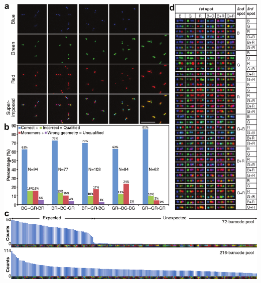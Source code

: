 \begin{FPfigure} %
\includegraphics[width=\textwidth]{figures/dna3}
\caption[Dual-labeled-zone fluorescent barcodes.]{Dual-labeled-zone fluorescent barcodes. (\textbf{a}) Typical TIRF microscopy images 
of five selected barcode species, shown both in separate channels and after 
superimposing. Scale bar: 5 \textmu m. (\textbf{b}) Statistics obtained by analyzing two 50×50 \textmu m$^2$ 
images of each barcode species (\textasciitilde85 barcodes, the exact sample size N is noted beside 
the corresponding bar-graph). The barcode types are noted under the x-axis of the 
diagram. Color scheme (unrelated to the pseudo-colors of the fluorophores): blue, correct 
barcodes (correct geometry and color identity); green, incorrect barcodes (correct 
geometry but incorrect color identity); red, monomer nanotubes (one spot or two 
connecting spots); and purple, barcodes with wrong geometry (i.e., bending angle <120°, 
see methods in SI). (\textbf{c}) Computer-aided barcode counting results of the 72-barcode pool 
(N=2,617) and the 216-barcode pool (N=7,243) plotted as bar-graphs with descending 
barcode counts from left to right (see Supplementary Tables S.1.6 and S.1.7 for the numeric counting results). 
A computer-generated reference barcode image is placed underneath the corresponding 
bar. (\textbf{d}) A table containing one representative TIRF image (1.4×0.7 \textmu m$^2$) for each of the 
216 dual-labeled-zone barcode species. 
\label{fig:dna3}}
\end{FPfigure}


